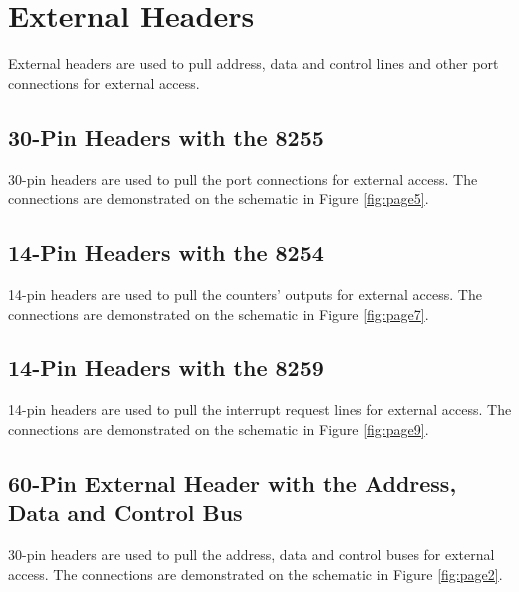 \newpage
\section{External Headers}
External headers are used to pull address, data and control lines and other port connections for external access.

    \subsection{30-Pin Headers with the 8255}
    30-pin headers are used to pull the port connections for external access. The connections are demonstrated on the schematic in Figure \ref{fig:page5}.

    \subsection{14-Pin Headers with the 8254}
    14-pin headers are used to pull the counters' outputs for external access. The connections are demonstrated on the schematic in Figure \ref{fig:page7}.

    \subsection{14-Pin Headers with the 8259}
    14-pin headers are used to pull the interrupt request lines for external access. The connections are demonstrated on the schematic in Figure \ref{fig:page9}.

    \subsection{60-Pin External Header with the Address, Data and Control Bus}
    30-pin headers are used to pull the address, data and control buses for external access. The connections are demonstrated on the schematic in Figure \ref{fig:page2}.
